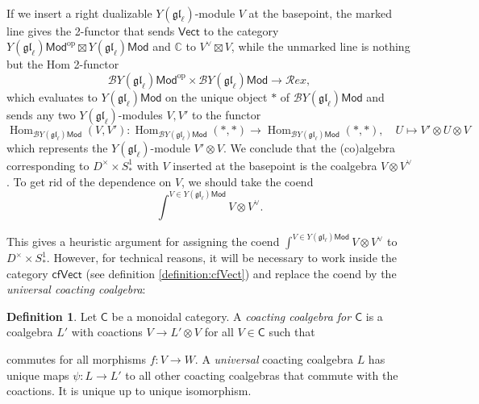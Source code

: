 \documentclass[11pt]{report}
\theoremstyle{definition}
\newtheorem{definition}[theorem]{Definition}
\theoremstyle{remark}
\theoremstyle{remark}
\newcommand{\Hom}{\operatorname{Hom}}
\newcommand{\id}{\textnormal{id}}
\newcommand{\C}{\mathbb{C}}
\begin{document}
~\\
If we insert a right dualizable $Y(\mathfrak{gl}_\ell)$-module $V$ at the basepoint, the marked line gives the 2-functor that sends $\mathsf{Vect}$ to the category $Y(\mathfrak{gl}_\ell)\mathsf{Mod}^\text{op} \boxtimes Y(\mathfrak{gl}_\ell)\mathsf{Mod}$ and $\C$ to $V^\vee \boxtimes V$, while the unmarked line is nothing but the Hom 2-functor
\begin{equation*}
\mathcal{B}Y(\mathfrak{gl}_\ell)\mathsf{Mod}^\text{op} \times \mathcal{B}Y(\mathfrak{gl}_\ell)\mathsf{Mod} \to \mathcal{R}ex,
\end{equation*}
which evaluates to $Y(\mathfrak{gl}_\ell)\mathsf{Mod}$ on the unique object $*$ of $\mathcal{B}Y(\mathfrak{gl}_\ell)\mathsf{Mod}$ and sends any two $Y(\mathfrak{gl}_\ell)$-modules $V,V'$ to the functor
\begin{equation*}
\Hom_{\mathcal{B}Y(\mathfrak{gl}_\ell)\mathsf{Mod}}(V,V'): \Hom_{\mathcal{B}Y(\mathfrak{gl}_\ell)\mathsf{Mod}}(*,*) \to \Hom_{\mathcal{B}Y(\mathfrak{gl}_\ell)\mathsf{Mod}}(*,*), \quad U \mapsto V' \otimes U \otimes V
\end{equation*}
which represents the $Y(\mathfrak{gl}_\ell)$-module $V' \otimes V$. We conclude that the (co)algebra corresponding to $D^\times \times S_*^1$ with $V$ inserted at the basepoint is the coalgebra $V \otimes V^\vee$. To get rid of the dependence on $V$, we should take the coend
\begin{equation*}
\int^{V \in Y(\mathfrak{gl}_\ell)\mathsf{Mod}} V \otimes V^\vee.
\end{equation*}

This gives a heuristic argument for assigning the coend $\int^{V \in Y(\mathfrak{gl}_\ell)\mathsf{Mod}} V \otimes V^\vee$ to $D^\times \times S_*^1$. However, for technical reasons, it will be necessary to work inside the category $\mathsf{cfVect}$ (see definition \ref{definition:cfVect}) and replace the coend by the \emph{universal coacting coalgebra}:

\begin{definition}
Let $\mathsf{C}$ be a monoidal category. A \emph{coacting coalgebra for $\mathsf{C}$} is a coalgebra $L'$ with coactions $V \to L' \otimes V$ for all $V \in \mathsf{C}$ such that
\begin{center}
\end{center}
commutes for all morphisms $f: V \to W$. A \emph{universal} coacting coalgebra $L$ has unique maps $\psi: L \to L'$ to all other coacting coalgebras that commute with the coactions. It is unique up to unique isomorphism.
\end{definition}
\end{document}
